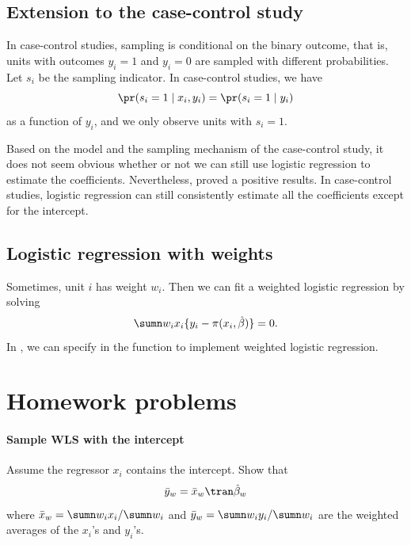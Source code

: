  

\subsection{Extension to the case-control study}\label{sec::case-control}

In case-control studies, sampling is conditional on the binary outcome, that is, units with outcomes $y_i=1$ and $y_i=0$ are sampled with different probabilities. Let $s_i$ be the sampling indicator. In case-control studies, we have
$$
\pr(s_i =1\mid x_i, y_i) = \pr(s_i =1\mid  y_i) 
$$
as a function of $y_i$, and we only observe units with $s_i = 1$. 


Based on the model and the sampling mechanism of the case-control study, it does not seem obvious whether or not we can still use logistic regression to estimate the coefficients. Nevertheless, \citet{prentice1979logistic} proved a positive results. In case-control studies, logistic regression can still consistently estimate all the coefficients except for the intercept.




\subsection{Logistic regression with weights}

Sometimes, unit $i$ has weight $w_i$. Then we can fit a weighted logistic regression by solving
$$
\sumn  w_i x_i  \{ y_i - \pi(x_{i}, \hat\beta)\} = 0.
$$
In , we can specify  in the  function to implement weighted logistic regression. 







\section{Homework problems}


 


\paragraph{Sample WLS with the intercept}\label{hw::sample-ols-intercept}

Assume the regressor $x_i$ contains the intercept. Show that 
\begin{equation}\label{eq::OLS-mean-data}
\bar{y}_w = \bar{x}_w\tran \hat{\beta}_w
\end{equation}
where $ \bar{x}_w =  \sumn w_i  x_i / \sumn w_i $ and $ \bar{y}_w =  \sumn w_i  y_i / \sumn w_i $ are the weighted averages of the $x_i$'s and $y_i$'s. 


